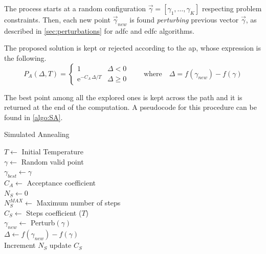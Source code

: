 \documentclass[12pt,journal,draftclsnofoot,onecolumn]{IEEEtran}
\begin{document}
The process starts at a random configuration $\vec{\gamma} = [\gamma_1, \ldots, \gamma_K]$ respecting problem constraints.
Then, each new point $\vec{\gamma}_{new}$ is found \emph{perturbing} previous vector $\vec{\gamma}$, as described in \autoref{sec:perturbations} for \gls{adfc} and \gls{edfc} algorithms.

The proposed solution is kept or rejected according to the \gls{ap}, whose expression is the following.
\begin{equation*} \label{accept_prob}
	P_A(\Delta, T) = \begin{cases}
		1 & \Delta < 0 \\
		\mathrm{e}^{ - C_A \, \Delta / T }
		& \Delta \geq 0
	\end{cases}
	\quad \quad \text{where} \quad \Delta = f(\gamma_{new})-f (\gamma)
\end{equation*}

The best point among all the explored ones is kept across the path and it is returned at the end of the computation.
A pseudocode for this procedure can be found in \autoref{algo:SA}.

\begin{algorithm}
\caption{Simulated Annealing} \label{algo:SA}
$T \gets$ Initial Temperature \\
$\gamma \gets$ Random valid point \\
$\gamma_{best} \gets \gamma$ \\
$C_A \gets$ Acceptance coefficient \\
$N_S \gets 0$ \\
$N_S^{MAX} \gets $ Maximum number of steps \\

 {
	$C_S \gets$ Steps coefficient ($T$) \\
	 {
		\vspace{1mm}
		$\gamma_{new} \gets$ Perturb$(\gamma)$\\
		$\Delta \gets f(\gamma_{new})-f(\gamma)$ \\
		Increment $N_S$
		update $C_S$\\
	}
}
\end{algorithm}
\end{document}
